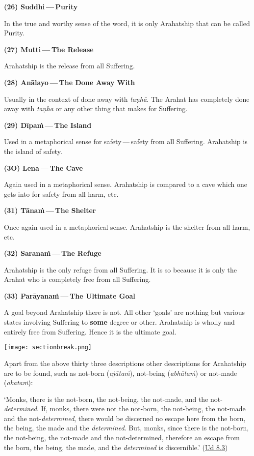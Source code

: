 \textbf{(26) Suddhi --- Purity}

\protect\hypertarget{suddhi}{}{}In the true and worthy sense of the word, it is only Arahatship that can be called Purity.

\textbf{(27) Mutti --- The Release}

Arahatship is the release from all Suffering.

\textbf{(28) Anālayo --- The Done Away With}

Usually in the context of done away with \emph{taṇhā}. The Arahat has completely done away with \emph{taṇhā} or any other thing that makes for Suffering.

\textbf{(29) Dīpaṁ --- The Island}

Used in a metaphorical sense for safety --- safety from all Suffering. Arahatship is the island of safety.

\textbf{(3O) Lena --- The Cave}

Again used in a metaphorical sense. Arahatship is compared to a cave which one gets into for safety from all harm, etc.

\textbf{(31) Tānaṁ --- The Shelter}

Once again used in a metaphorical sense. Arahatship is the shelter from all harm, etc.

\textbf{(32) Saranaṁ --- The Refuge}

Arahatship is the only refuge from all Suffering. It is so because it is only the Arahat who is completely free from all Suffering.

\textbf{(33) Parāyanaṁ --- The Ultimate Goal}

A goal beyond Arahatship there is not. All other `goals' are nothing but various states involving Suffering to \textbf{some} degree or other. Arahatship is wholly and entirely free from Suffering. Hence it is the ultimate goal.

\texttt{[image: sectionbreak.png]}

Apart from the above thirty three descriptions other descriptions for Arahatship are to be found, such as not-born (\emph{ajātaṁ}), not-being (\emph{abhūtaṁ}) or not-made (\emph{akataṁ}):

`Monks, there is the not-born, the not-being, the not-made, and the not-\emph{determined}. If, monks, there were not the not-born, the not-being, the not-made and the not-\emph{determined}, there would be discerned no escape here from the born, the being, the made and the \emph{determined}. But, monks, since there is the not-born, the not-being, the not-made and the not-determined, therefore an escape from the born, the being, the made, and the \emph{determined} is discernible.' (\href{https://suttacentral.net/ud8.3/en/anandajoti}{Ud 8.3})

